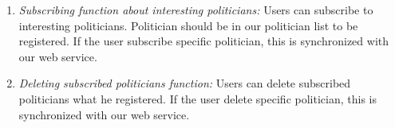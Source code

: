 \documentclass[conference]{IEEEtran}
\begin{document}
\begin{enumerate}
\begin{enumerate}
        \item \textit {Subscribing function about interesting politicians:} Users can subscribe to interesting politicians.  Politician should be in our politician list to be registered. If the user subscribe specific politician, this is synchronized with our web service.\\
        \item \textit {Deleting subscribed politicians function:} Users can delete subscribed politicians what he registered. If the user delete specific politician, this is synchronized with our web service.\\
           \end{enumerate}
           

      

\end{enumerate}
    

 
 
\end{document}
